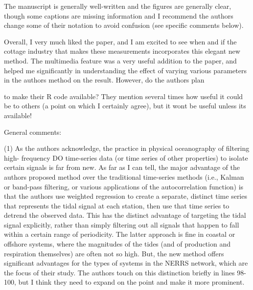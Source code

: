 \documentclass[letterpaper,12pt]{article}\usepackage[]{graphicx}\usepackage[]{color}
\begin{document}
The manuscript is generally well-written and the figures are generally clear, though some captions are missing information and I recommend the authors change some of their notation to avoid confusion (see specific comments below).

Overall, I very much liked the paper, and I am excited to see when and if the cottage industry that makes these measurements incorporates this elegant new method. The multimedia feature was a very useful addition to the paper, and helped me significantly in understanding the effect
of varying various parameters in the authors method on the result. However, do the authors plan
 
to make their R code available? They mention several times how useful it could be to others (a
point on which I certainly agree), but it wont be useful unless its available!

General comments:

(1) As the authors acknowledge, the practice in physical oceanography of filtering high- frequency DO time-series data (or time series of other properties) to isolate certain signals is far from new. As far as I can tell, the major advantage of the authors proposed method over the traditional time-series methods (i.e., Kalman or band-pass filtering, or various applications of the autocorrelation function) is that the authors use weighted regression to create a separate, distinct time series that represents the tidal signal at each station, then use that time series to detrend the observed data. This has the distinct advantage of targeting the tidal signal explicitly, rather than simply filtering out all signals that happen to fall within a certain range of periodicity. The latter approach is fine in coastal or offshore systems, where the magnitudes of the tides (and of production and respiration themselves) are often not so high. But, the new method offers significant advantages for the types of systems in the NERRS network, which are the focus of their study. The authors touch on this distinction briefly in lines 98-100, but I think they need to expand on the point and make it more prominent.
\end{document}
